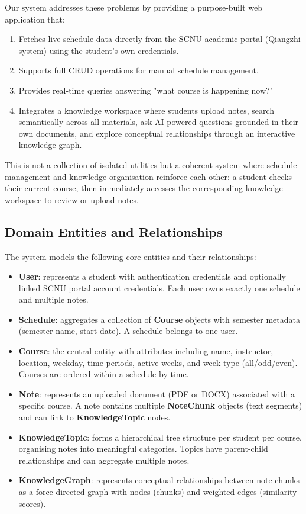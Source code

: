 \documentclass[11pt,a4paper]{article}
\begin{document}
Our system addresses these problems by providing a purpose-built web application that:
\begin{enumerate}
    \item Fetches live schedule data directly from the SCNU academic portal (Qiangzhi system) using the student's own credentials.
    \item Supports full CRUD operations for manual schedule management.
    \item Provides real-time queries answering "what course is happening now?"
    \item Integrates a knowledge workspace where students upload notes, search semantically across all materials, ask AI-powered questions grounded in their own documents, and explore conceptual relationships through an interactive knowledge graph.
\end{enumerate}

This is not a collection of isolated utilities but a coherent system where schedule management and knowledge organisation reinforce each other: a student checks their current course, then immediately accesses the corresponding knowledge workspace to review or upload notes.

\subsection{Domain Entities and Relationships}
The system models the following core entities and their relationships:

\begin{itemize}
    \item \textbf{User}: represents a student with authentication credentials and optionally linked SCNU portal account credentials. Each user owns exactly one schedule and multiple notes.
    \item \textbf{Schedule}: aggregates a collection of \textbf{Course} objects with semester metadata (semester name, start date). A schedule belongs to one user.
    \item \textbf{Course}: the central entity with attributes including name, instructor, location, weekday, time periods, active weeks, and week type (all/odd/even). Courses are ordered within a schedule by time.
    \item \textbf{Note}: represents an uploaded document (PDF or DOCX) associated with a specific course. A note contains multiple \textbf{NoteChunk} objects (text segments) and can link to \textbf{KnowledgeTopic} nodes.
    \item \textbf{KnowledgeTopic}: forms a hierarchical tree structure per student per course, organising notes into meaningful categories. Topics have parent-child relationships and can aggregate multiple notes.
    \item \textbf{KnowledgeGraph}: represents conceptual relationships between note chunks as a force-directed graph with nodes (chunks) and weighted edges (similarity scores).
\end{itemize}
\end{document}
